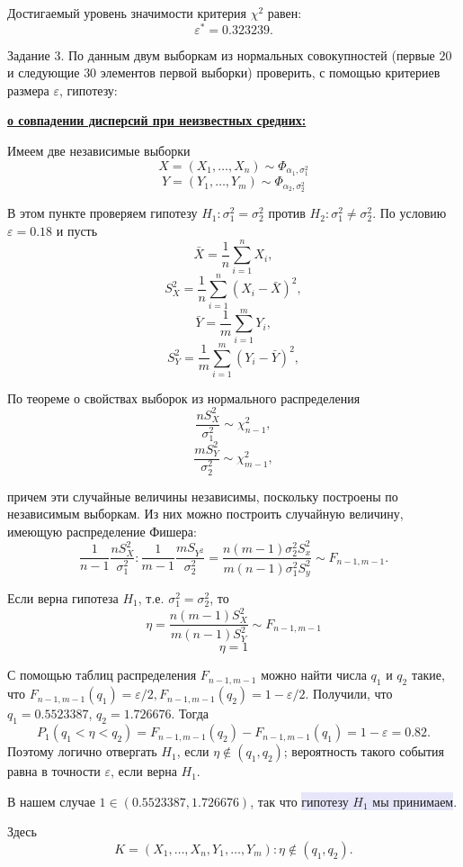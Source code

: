\documentclass{article}
\begin{document}
Достигаемый уровень значимости критерия $\chi^2$ равен:
\[\varepsilon^* =  0.323239.\]


\colorbox{light-gray}{Задание 3.}
По данным двум выборкам из нормальных совокупностей (первые $20$ и следующие $30$ элементов первой выборки) проверить, с помощью критериев размера $\varepsilon$, гипотезу:

\underline{\bf о совпадении дисперсий при неизвестных средних:}

Имеем две независимые выборки
\[X = \left(X_1,\dots, X_n \right) \sim \Phi_{\alpha_1, \sigma_1^2}\]
\[Y = \left(Y_1,\dots, Y_m \right) \sim \Phi_{\alpha_2, \sigma_2^2}\]

В этом пункте проверяем гипотезу $H_1: \sigma_1^2 = \sigma_2^2$ против $H_2: \sigma_1^2 \neq \sigma_2^2$. По условию $\varepsilon = 0.18$ и пусть 
\[ \bar X  = \dfrac{1}{n} \sum_{i=1}^n X_i, \] 
\[ S_{X}^2 = \dfrac{1}{n} \sum_{i=1}^n \left(X_i - \bar X\right)^2, \]
\[ \bar Y  = \dfrac{1}{m} \sum_{i=1}^m Y_i, \] 
\[ S_{Y}^2 = \dfrac{1}{m} \sum_{i=1}^m \left(Y_i - \bar Y\right)^2, \]

По теореме о свойствах выборок из нормального распределения 
\[\dfrac{n S_{X}^2}{\sigma_1^2} \sim \chi_{n - 1}^2,\]
\[\dfrac{m S_{Y}^2}{\sigma_2^2} \sim \chi_{m - 1}^2,\]

причем эти случайные величины независимы, поскольку построены по независимым
выборкам. Из них можно построить случайную величину, имеющую распределение
Фишера:
\[\dfrac{1}{n - 1} \dfrac{n S_{X}^2}{\sigma_1^2} : \dfrac{1}{m - 1} \dfrac{m S_{Y^2}}{\sigma_2^2} = \dfrac{n (m - 1) \sigma_2^2 S_x^2}{m (n - 1) \sigma_1^2 S_y^2} \sim F_{n - 1, m - 1}. \]

Если верна гипотеза $H_1$, т.е. $\sigma_1^2 = \sigma_2^2$, то 
\[ \eta = \dfrac{n (m - 1) S_{X}^2}{m (n - 1) S_{Y}^2} \sim F_{n - 1, m - 1}\]
\[ \eta = 1 \]

С помощью таблиц распределения $F_{n - 1, m - 1}$ можно найти числа $q_1$ и $q_2$ такие, что $F_{n - 1, m - 1}(q_1) = \varepsilon / 2, F_{n - 1, m - 1}(q_2) = 1 - \varepsilon / 2.$ Получили, что $q_1 = 0.5523387$, $q_2 = 1.726676$. Тогда 
\[P_1\left(q_1 < \eta < q_2\right) = F_{n - 1, m - 1}(q_2) - F_{n - 1, m - 1}(q_1) = 1 - \varepsilon = 0.82.\]
Поэтому логично отвергать $H_1$, если $\eta \not\in (q_1, q_2)$; вероятность такого события равна в точности $\varepsilon$, если верна $H_1$.

В нашем случае $1 \in (0.5523387, 1.726676)$, так что \colorbox{Lavender}{гипотезу $H_1$ мы принимаем}.

Здесь 
\[K =  {(X_1, \dots, X_n, Y_1, \dots, Y_m) : \eta \notin (q_1, q_2)}.\]
\end{document}
